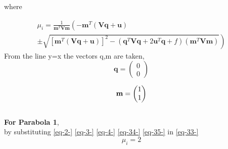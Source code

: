 \documentclass[journal,12pt,twocolumn]{IEEEtran}
\newcommand{\myvec}[1]{\ensuremath{\begin{pmatrix}#1\end{pmatrix}}}
\let\vec\mathbf
\let\vec\mathbf
\providecommand{\brak}[1]{\ensuremath{\left(#1\right)}}
\providecommand{\lbrak}[1]{\ensuremath{\left(#1\right.}}
\providecommand{\rbrak}[1]{\ensuremath{\left.#1\right)}}
\providecommand{\sbrak}[1]{\ensuremath{{}\left[#1\right]}}
\begin{document}
%
where
{\tiny
\begin{multline}
\mu_i = \frac{1}
{
\vec{m}^T\vec{V}\vec{m}
}
\lbrak{-\vec{m}^T\brak{\vec{V}\vec{q}+\vec{u}}}
\\
\pm
\rbrak{\sqrt{
\sbrak{
\vec{m}^T\brak{\vec{V}\vec{q}+\vec{u}}
}^2
-
\brak
{
\vec{q}^T\vec{V}\vec{q} + 2\vec{u}^T\vec{q} +f
}
\brak{\vec{m}^T\vec{V}\vec{m}}
\label{eq-33-} 
}
}
\end{multline}
\normalsize
From the line y=x the vectors q,m are taken,
\begin{equation}
\vec{q}=\myvec{0\\0}
\label{eq-34-} 
\end{equation}

\begin{equation} \\
\vec{m}=\myvec{1\\1}
\label{eq-35-} 
\end{equation}
\\
\textbf{For Parabola 1},\\

by substituting \eqref{eq-2-} \eqref{eq-3-} \eqref{eq-4-} \eqref{eq-34-} \eqref{eq-35-}  in \hspace{1mm}\eqref{eq-33-}
\begin{equation}
\mu_i=2
\label{eq-36-} 
\end{equation}

}
\end{document}
